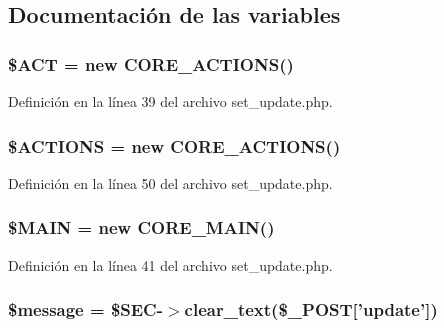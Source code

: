 \subsection{Documentación de las variables}
\hypertarget{set__update_8php_acccd6054a25e75994d89dd0d42dab8fc}{
\subsubsection[{\$\-A\-C\-T}]{\setlength{\rightskip}{0pt plus 5cm}\$A\-C\-T = new {\bf C\-O\-R\-E\-\_\-\-A\-C\-T\-I\-O\-N\-S}()}}\label{set__update_8php_acccd6054a25e75994d89dd0d42dab8fc}


Definición en la línea 39 del archivo set\-\_\-update.\-php.

\hypertarget{set__update_8php_afd09e7ecb266b5fb5bf6e9c716b64a40}{
\subsubsection[{\$\-A\-C\-T\-I\-O\-N\-S}]{\setlength{\rightskip}{0pt plus 5cm}\$A\-C\-T\-I\-O\-N\-S = new {\bf C\-O\-R\-E\-\_\-\-A\-C\-T\-I\-O\-N\-S}()}}\label{set__update_8php_afd09e7ecb266b5fb5bf6e9c716b64a40}


Definición en la línea 50 del archivo set\-\_\-update.\-php.

\hypertarget{set__update_8php_aa3efd4a61925b50d9d066bd2b42dcd3d}{
\subsubsection[{\$\-M\-A\-I\-N}]{\setlength{\rightskip}{0pt plus 5cm}\$M\-A\-I\-N = new {\bf C\-O\-R\-E\-\_\-\-M\-A\-I\-N}()}}\label{set__update_8php_aa3efd4a61925b50d9d066bd2b42dcd3d}


Definición en la línea 41 del archivo set\-\_\-update.\-php.

\hypertarget{set__update_8php_abf17cb2dba2ed17cb28aa5f37deb5293}{
\subsubsection[{\$message}]{\setlength{\rightskip}{0pt plus 5cm}\$message = \$S\-E\-C-\/$>$clear\-\_\-text(\$\-\_\-\-P\-O\-S\-T\mbox{[}'update'\mbox{]})}}\label{set__update_8php_abf17cb2dba2ed17cb28aa5f37deb5293}


